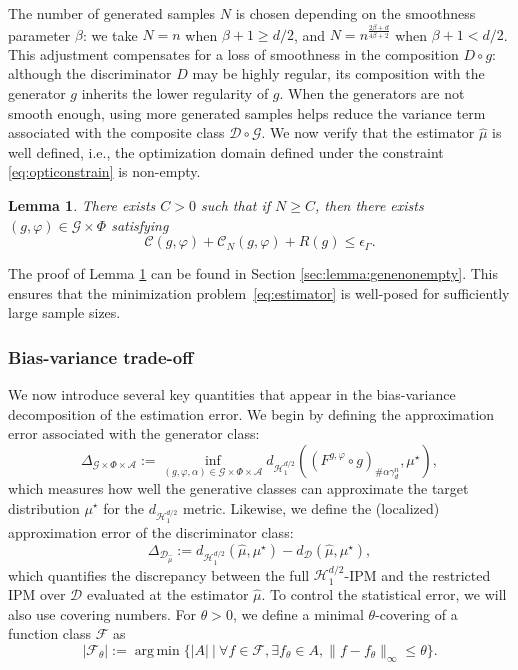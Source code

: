\documentclass[10pt]{article}
\newtheorem{lemma}{Lemma}
\DeclareMathOperator*{\argmin}{arg\,min}
\begin{document}
The number of generated samples \( N \) is chosen depending on the smoothness parameter \( \beta \): we take \( N = n \) when \( \beta+1 \geq d/2 \), and \( N = n^{\frac{2\beta + d}{4\beta+2}} \) when \( \beta+1 < d/2 \). This adjustment compensates for a loss of smoothness in the composition \( D \circ g \): although the discriminator \( D \) may be highly regular, its composition with the generator \( g \) inherits the lower regularity of \( g \). When the generators are not smooth enough, using more generated samples helps reduce the variance term associated with the composite class \( \mathcal{D} \circ \mathcal{G} \). We now verify that the estimator \( \hat{\mu} \) is well defined, i.e., the optimization domain defined under the constraint \eqref{eq:opticonstrain} is non-empty.

\begin{lemma}\label{lemma:genenonempty}
    There exists $C>0$ such that if $N\geq C$, then there exists $(g,\varphi)\in \mathcal{G}\times  \Phi$ satisfying
    $$\mathcal{C}(g,\varphi) + \mathcal{C}_N(g,\varphi) +R(g)\leq \epsilon_\Gamma.$$
\end{lemma}
The proof of Lemma \ref{lemma:genenonempty} can be found in Section \ref{sec:lemma:genenonempty}. This ensures that the minimization problem~\eqref{eq:estimator} is well-posed for sufficiently large sample sizes.

\subsubsection{Bias-variance trade-off}

We now introduce several key quantities that appear in the  bias-variance decomposition of the estimation error. We begin by defining the approximation error associated with the generator class:
\begin{equation}\label{eq:deltaG}
    \Delta_{\mathcal{G}\times \Phi \times \mathcal{A}} := \inf_{(g,\varphi,\alpha)\in \mathcal{G}\times  \Phi\times \mathcal{A}} d_{\mathcal{H}_1^{d/2}}((F^{g,\varphi}\circ g)_{\# \alpha \gamma_d^n},\mu^\star),
\end{equation}
which measures how well the generative classes can approximate the target distribution \( \mu^\star \) for the \( d_{\mathcal{H}_1^{d/2}} \) metric. Likewise,
we define the (localized) approximation error of the discriminator class:
\begin{equation}\label{eq:deltaD}
    \Delta_{\mathcal{D}_{\hat{\mu}}} := d_{\mathcal{H}_1^{d/2}}(\hat{\mu},\mu^\star)-d_{\mathcal{D}}(\hat{\mu},\mu^\star),
\end{equation}
which quantifies the discrepancy between the full \( \mathcal{H}_1^{d/2} \)-IPM and the restricted IPM over \( \mathcal{D} \) evaluated at the estimator \( \hat{\mu} \).
To control the statistical error, we will also use covering numbers. For \( \theta > 0 \), we define a minimal \( \theta \)-covering of a function class \( \mathcal{F} \) as
\begin{equation}\label{eq:coveringnum}
|\mathcal{F}_\theta|:=\argmin \{|A|\ |\ \forall f \in \mathcal{F},\exists f_\theta \in A, \|f-f_\theta\|_\infty\leq \theta\}.
\end{equation}
\end{document}
